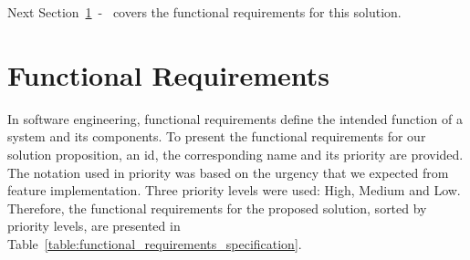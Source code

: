 Next Section~\ref{sec:functional_requirements}~-~ covers the functional requirements for this solution.

\section{Functional Requirements}
\label{sec:functional_requirements}

In software engineering, functional requirements define the intended function of a system and its components. To present the functional requirements for our solution proposition, an id, the corresponding name and its priority are provided. The notation used in priority was based on the urgency that we expected from feature implementation. Three priority levels were used: High, Medium and Low. Therefore, the functional requirements for the proposed solution, sorted by priority levels, are presented in Table~\ref{table:functional_requirements_specification}.

